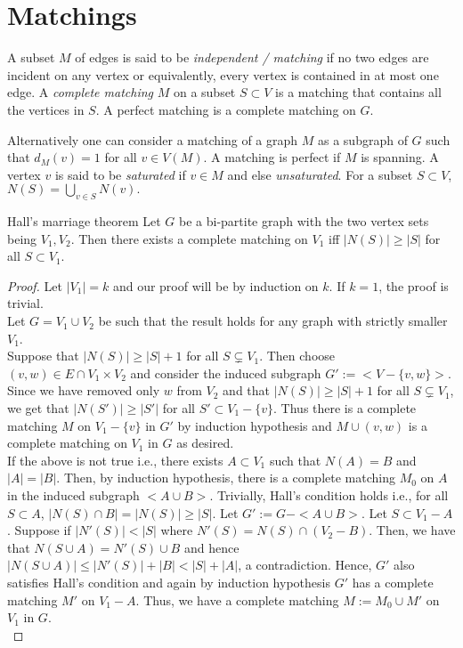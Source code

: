 \documentclass[../basic_graph_theory.tex]{subfiles}
\begin{document}
\chapter{Matchings}
\setcounter{chapter}{5} %
\setcounter{section}{0}
\setcounter{equation}{0}
\setcounter{figure}{0}

\begin{defn} 
    A subset $M$ of edges is said to be {\em independent / matching} if no two edges are incident on any vertex or equivalently, every vertex is contained in at most one edge. A {\em complete matching} $M$ on a subset $S \subset V$ is a matching that contains all the vertices in $S$. A perfect matching is a complete matching on $G$.
\end{defn}
%
Alternatively one can consider a matching of a graph $M$ as a subgraph of $G$ such that $d_M(v) = 1$ for all $v \in V(M)$. A matching is perfect if $M$ is spanning. A vertex $v$ is said to be {\em saturated} if $v \in M$ and else {\em unsaturated}. For a subset $S \subset V$, $N(S) = \bigcup_{v \in S}N(v).$
%
\begin{Thm}{Hall's marriage theorem}{} 
    Let $G$ be a bi-partite graph with the two vertex sets being $V_1,V_2$.  Then there exists a complete matching on $V_1$ iff $|N(S)| \geq |S|$ for all $S \subset V_1$.
\end{Thm}
%
\begin{proof}
    Let $|V_1| = k$ and our proof will be by induction on $k$. If $k = 1$, the proof is trivial.\\
    Let $G = V_1 \cup V_2$ be such that the result holds for any graph with strictly smaller $V_1$.\\
    Suppose that $|N(S)| \geq |S| + 1$ for all $S \subsetneq V_1$. Then choose $(v,w) \in E \cap V_1 \times V_2$ and consider the induced subgraph $G' := <V - \{v,w\}>$. Since we have removed only $w$ from $V_2$ and that $|N(S)| \geq |S| + 1$ for all $S \subsetneq V_1$, we get that $|N(S')| \geq |S'|$ for all $S' \subset V_1 - \{v\}$. Thus there is a complete matching $M$ on $V_1 - \{v\}$ in $G'$ by induction hypothesis and $M \cup (v,w)$ is a complete matching on $V_1$ in $G$ as desired.\\
    If the above is not true i.e., there exists $A \subset V_1$ such that $N(A) = B$ and $|A| = |B|$. Then, by induction hypothesis, there is a complete matching $M_0$ on $A$ in the induced subgraph $<A \cup B>$. Trivially,  Hall's condition holds i.e., for all $S \subset A$,  $|N(S) \cap B| =  |N(S)| \geq |S|$. Let $G' := G - <A \cup B>$.  Let $S \subset V_1 - A$.  Suppose if $|N'(S)| < |S|$ where $N'(S) = N(S) \cap (V_2 - B)$.  Then,  we have that $N(S \cup A) = N'(S) \cup B$ and hence $|N(S \cup A)| \leq |N'(S)| + |B| < |S| + |A|$,  a contradiction.  Hence, $G'$ also satisfies Hall's condition and again by induction hypothesis $G'$ has a complete matching $M'$ on $V_1 -A$. Thus, we have a complete matching $M := M_0 \cup M'$ on $V_1$ in $G$.\\
\end{proof}
\end{document}
